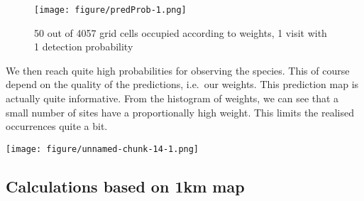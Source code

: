 \documentclass[]{article}
\newenvironment{Shaded}{\begin{snugshade}}{\end{snugshade}}
\newcommand{\KeywordTok}[1]{\textcolor[rgb]{0.13,0.29,0.53}{\textbf{#1}}}
\newcommand{\OperatorTok}[1]{\textcolor[rgb]{0.81,0.36,0.00}{\textbf{#1}}}
\newcommand{\NormalTok}[1]{#1}
\begin{document}
\begin{figure}
\centering
\texttt{[image: figure/predProb-1.png]}
\caption{50 out of 4057 grid cells occupied according to weights, 1
visit with 1 detection probability}
\end{figure}

We then reach quite high probabilities for observing the species. This
of course depend on the quality of the predictions, i.e.~our weights.
This prediction map is actually quite informative. From the histogram of
weights, we can see that a small number of sites have a proportionally
high weight. This limits the realised occurrences quite a bit.

\begin{Shaded}
\end{Shaded}

\texttt{[image: figure/unnamed-chunk-14-1.png]}

\subsection{Calculations based on 1km
map}\label{calculations-based-on-1km-map}
\end{document}
